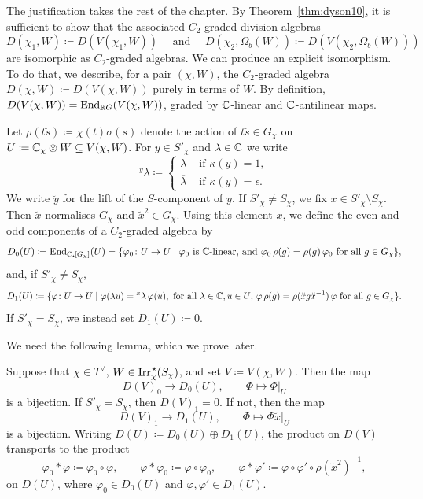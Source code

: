 \begin{just}
  The justification takes the rest of the chapter. By Theorem~\ref{thm:dyson10}, it is sufficient to show that the associated $C_2$-graded division algebras
  \[D(\chi_1, W) \coloneqq D(V(\chi_1, W)) \quad \mbox{ and } \quad D(\chi_2, \Omega_b(W)) \coloneqq D(V(\chi_2, \Omega_b(W)))\]
  are isomorphic as $C_2$-graded algebras. We can produce an explicit isomorphism.
To do that, we describe, for a pair $(\chi, W)$, the $C_2$-graded algebra $D(\chi, W) \coloneqq D(V(\chi, W))$ purely in terms of $W$. By definition, $D(V(\chi, W)) = \operatorname{End}_{{\mathbb R} G}(V(\chi, W))$, graded by ${\mathbb C}$-linear and ${\mathbb C}$-antilinear maps.

Let $\rho(t \breve{s}) \coloneqq \chi(t) \sigma(s)$ denote the action of $t \breve{s} \in G_{\chi}$ on $U \coloneqq {\mathbb C}_{\chi} \otimes W \subseteq V(\chi, W)$. For $y \in S'_{\chi}$ and $\lambda \in {\mathbb C}$ we write
\[{}^{y}\lambda
\coloneqq
\begin{cases}
  \lambda & \mbox{ if } \kappa(y) = 1,\\
  \overline{\lambda} & \mbox{ if } \kappa(y) = \epsilon.
\end{cases}\]
We write $\breve{y}$ for the lift of the $S$-component of $y$. If $S'_{\chi} \neq S_{\chi}$, we fix $x \in S'_{\chi} \setminus S_{\chi}$. Then $\breve{x}$ normalises $G_{\chi}$ and $\breve{x}^2 \in G_{\chi}$.
Using this element $x$, we define the even and odd components of a $C_2$-graded algebra by
\[
D_0(U) \coloneqq \operatorname{End}_{{\mathbb C}_{\star \hspace{-0.1em}}[G_{\chi}]}(U) = \{ \varphi_0 \colon U \rightarrow U \mid \varphi_0 \text{ is ${\mathbb C}$-linear, and } \varphi_0 \, \rho(g) = \rho(g) \, \varphi_0 \text{ for all } g \in G_{\chi} \},
\]
and, if $S'_{\chi} \neq S_{\chi}$, 
\[
D_1(U) \coloneqq \{ \varphi \colon U \rightarrow U \mid \varphi(\lambda u) = {}^{x}\lambda \, \varphi(u), \text{ for all $\lambda \in {\mathbb C}, u \in U$, } \varphi \, \rho(g) = \rho(\breve{x} g \breve{x}^{-1}) \, \varphi \text{ for all } g \in G_{\chi} \}.
\]
If $S'_{\chi} = S_{\chi}$, we instead set $D_1(U) \coloneqq 0$.

We need the following lemma, which we prove later.

\hrulefill
\begin{lemma}\label{lem:modelonW}
  Suppose that $\chi \in T^{\vee}$, $W \in \operatorname{Irr}_{\chi}^{\hspace{0.1em} \star}(S_{\chi})$, and set $V \coloneqq V(\chi, W)$. Then the map 
  \[
  D(V)_0 \rightarrow D_0(U), \qquad \Phi \mapsto \Phi|_U
  \]
  is a bijection. If $S'_{\chi} = S_{\chi}$, then $D(V)_1 = 0$. If not, then the map
  \[
  D(V)_1 \rightarrow D_1(U), \qquad \Phi \mapsto \Phi \breve{x}|_U
  \]
  is a bijection. Writing $D(U) \coloneqq D_0(U) \oplus D_1(U)$, the product on $D(V)$ transports to the product 
\[
\varphi_0 * \varphi \coloneqq \varphi_0 \circ \varphi, \qquad \varphi * \varphi_0 \coloneqq \varphi \circ \varphi_0, \qquad \varphi * \varphi' \coloneqq \varphi \circ \varphi' \circ \rho(\breve{x}^2)^{-1},
\]
on $D(U)$, where $\varphi_0 \in D_0(U)$ and $\varphi, \varphi' \in D_1(U)$.
\end{lemma}
\hrulefill


\end{just}
